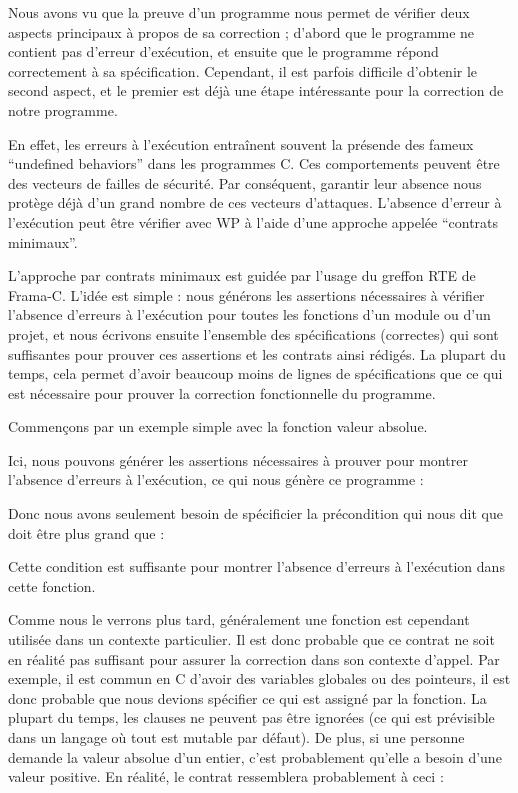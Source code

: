 Nous avons vu que la preuve d'un programme nous permet de vérifier deux aspects
principaux à propos de sa correction ; d'abord que le programme ne contient pas
d'erreur d'exécution, et ensuite que le programme répond correctement à sa
spécification. Cependant, il est parfois difficile d'obtenir le second aspect,
et le premier est déjà une étape intéressante pour la correction de notre programme.


En effet, les erreurs à l'exécution entraînent souvent la présende des fameux
``undefined behaviors'' dans les programmes C. Ces comportements peuvent être
des vecteurs de failles de sécurité. Par conséquent, garantir leur absence nous
protège déjà d'un grand nombre de ces vecteurs d'attaques. L'absence d'erreur à
l'exécution peut être vérifier avec WP à l'aide d'une approche appelée
``contrats minimaux''.




L'approche par contrats minimaux est guidée par l'usage du greffon RTE de Frama-C.
L'idée est simple : nous générons les assertions nécessaires à vérifier l'absence
d'erreurs à l'exécution pour toutes les fonctions d'un module ou d'un projet, et
nous écrivons ensuite l'ensemble des spécifications (correctes) qui sont suffisantes
pour prouver ces assertions et les contrats ainsi rédigés. La plupart du temps, cela
permet d'avoir beaucoup moins de lignes de spécifications que ce qui est nécessaire
pour prouver la correction fonctionnelle du programme.


Commençons par un exemple simple avec la fonction valeur absolue.




Ici, nous pouvons générer les assertions nécessaires à prouver pour montrer
l'absence d'erreurs à l'exécution, ce qui nous génère ce programme :




Donc nous avons seulement besoin de spécificier la précondition qui nous dit que
 doit être plus grand que  :




Cette condition est suffisante pour montrer l'absence d'erreurs à l'exécution
dans cette fonction.


Comme nous le verrons plus tard, généralement une fonction est cependant utilisée
dans un contexte particulier. Il est donc probable que ce contrat ne soit en
réalité pas suffisant pour assurer la correction dans son contexte d'appel. Par
exemple, il est commun en C d'avoir des variables globales ou des pointeurs, il
est donc probable que nous devions spécifier ce qui est assigné par la fonction.
La plupart du temps, les clauses  ne peuvent pas être ignorées
(ce qui est prévisible dans un langage où tout est mutable par défaut). De plus,
si une personne demande la valeur absolue d'un entier, c'est probablement qu'elle
a besoin d'une valeur positive. En réalité, le contrat ressemblera probablement à
ceci :


